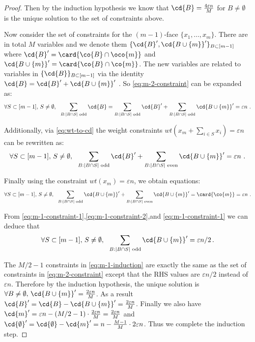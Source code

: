 \begin{proof}
    Then by the induction hypothesis we know that 
    $\cd{B} = \frac{4\varepsilon n }{M}$ for $B \neq \emptyset $ is the unique solution to the set of constraints above.

    Now consider the set of constraints for the $(m-1)$-face $\{x_1,\dots,x_m\}$. 
    There are in total $M$ variables and we denote them $\{\cd{B}',\cd{B\cup\{m\}}'\}_{B\subset[m-1]}$ where $\cd{B}' =  \card{\co{B}\cap \oco{m}}$ and $\cd{B\cup\{m\}}' = \card{\co{B}\cap \co{m}}$. 
    The new variables are related to variables in $\{\cd{B}\}_{B\subset[m-1]}$ via the identity $\cd{B} = \cd{B}'+\cd{B\cup\{m\}}'$ . 
    So \eqref{eq:m-2-constraint} can be expanded as:
    \begin{equation}\label{eq:m-1-constraint-1}
        \forall S\subset[m-1],\,S\neq \emptyset,~~  \sum_{B: |B\cap S| \text{ odd}} \cd{B} = \sum_{B: |B\cap S| \text{ odd}} \cd{B}' + \sum_{B: |B\cap S| \text{ odd}} \cd{B\cup\{m\}}' =  \varepsilon n~.
    \end{equation}
    

    Additionally, via \eqref{eq:wt-to-cd} the weight constraints $wt\left(x_m + \sum_{i\in S} x_i\right) = \varepsilon n$ can be rewritten as:
    \begin{equation}\label{eq:m-1-constraint-2}
        \forall S\subset[m-1],\,S\neq \emptyset,~~ \sum_{B: |B\cap S| \text{ odd}} \cd{B}' + \sum_{B: |B\cap S| \text{ even}} \cd{B\cup\{m\}}' = \varepsilon n ~.
    \end{equation}

    Finally using the constraint $wt(x_m) = \varepsilon n$, we obtain equations:
    \begin{equation}\label{eq:m-1-constraint-3}
        \forall S\subset[m-1],\,S\neq \emptyset,~~\sum_{B: |B\cap S| \text{ odd}} \cd{B\cup\{m\}}' + \sum_{B: |B\cap S| \text{ even}} \cd{B\cup\{m\}}' = \card{\co{m}} = \varepsilon n ~.
    \end{equation}

    From \eqref{eq:m-1-constraint-1},\eqref{eq:m-1-constraint-2},and \eqref{eq:m-1-constraint-1} we can deduce that 
    \begin{equation}\label{eq:m-1-induction}
    \forall S\subset[m-1],\,S\neq \emptyset,~~ \sum_{B: |B\cap S| \text{ odd}} \cd{B\cup\{m\}}' = \varepsilon n/2\,.
    \end{equation}

    The $M/2-1$ constraints in \eqref{eq:m-1-induction} are exactly the same as the set of constraints in \eqref{eq:m-2-constraint} except that the RHS values are $\varepsilon n/2$ instead of $\varepsilon n$. Therefore by the induction hypothesis, the unique solution is $\forall B \neq \emptyset,\, \cd{B\cup\{m\}}'= \frac{2\varepsilon n}{M}$. As a result $\cd{B}'= \cd{B}-\cd{B\cup\{m\}}' = \frac{2\varepsilon n}{M}$. Finally we also have $\cd{m}' = \varepsilon n - (M/2-1)\cdot \frac{2\varepsilon n}{M} = \frac{2\varepsilon n}{M}$ and $\cd{\emptyset}' = \cd{\emptyset}-\cd{m}' = n - \frac{M-1}{M}\cdot 2\varepsilon n$. Thus we complete the induction step.
\end{proof}


